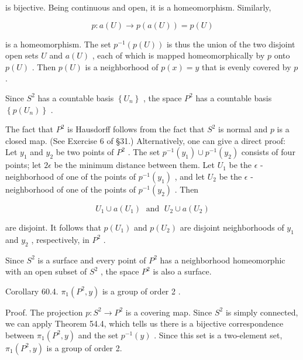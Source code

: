is bijective. Being continuous and open, it is a homeomorphism. Similarly,

\[
p : a\left( U\right)  \rightarrow  p\left( {a\left( U\right) }\right)  = p\left( U\right)
\]

is a homeomorphism. The set \({p}^{-1}\left( {p\left( U\right) }\right)\) is thus the union of the two disjoint open sets \(U\) and \(a\left( U\right)\) , each of which is mapped homeomorphically by \(p\) onto \(p\left( U\right)\) . Then \(p\left( U\right)\) is a neighborhood of \(p\left( x\right)  = y\) that is evenly covered by \(p\) .

Since \({S}^{2}\) has a countable basis \(\left\{  {U}_{n}\right\}\) , the space \({P}^{2}\) has a countable basis \(\left\{  {p\left( {U}_{n}\right) }\right\}\) .

The fact that \({P}^{2}\) is Hausdorff follows from the fact that \({S}^{2}\) is normal and \(p\) is a closed map. (See Exercise 6 of §31.) Alternatively, one can give a direct proof: Let \({y}_{1}\) and \({y}_{2}\) be two points of \({P}^{2}\) . The set \({p}^{-1}\left( {y}_{1}\right)  \cup  {p}^{-1}\left( {y}_{2}\right)\) consists of four points; let \({2\epsilon }\) be the minimum distance between them. Let \({U}_{1}\) be the \(\epsilon\) -neighborhood of one of the points of \({p}^{-1}\left( {y}_{1}\right)\) , and let \({U}_{2}\) be the \(\epsilon\) -neighborhood of one of the points of \({p}^{-1}\left( {y}_{2}\right)\) . Then

\[
{U}_{1} \cup  a\left( {U}_{1}\right) \;\text{ and }\;{U}_{2} \cup  a\left( {U}_{2}\right)
\]

are disjoint. It follows that \(p\left( {U}_{1}\right)\) and \(p\left( {U}_{2}\right)\) are disjoint neighborhoods of \({y}_{1}\) and \({y}_{2}\) , respectively, in \({P}^{2}\) .

Since \({S}^{2}\) is a surface and every point of \({P}^{2}\) has a neighborhood homeomorphic with an open subset of \({S}^{2}\) , the space \({P}^{2}\) is also a surface.

Corollary 60.4. \({\pi }_{1}\left( {{P}^{2},y}\right)\) is a group of order 2 .

Proof. The projection \(p : {S}^{2} \rightarrow  {P}^{2}\) is a covering map. Since \({S}^{2}\) is simply connected, we can apply Theorem 54.4, which tells us there is a bijective correspondence between \({\pi }_{1}\left( {{P}^{2},y}\right)\) and the set \({p}^{-1}\left( y\right)\) . Since this set is a two-element set, \({\pi }_{1}\left( {{P}^{2},y}\right)\) is a group of order 2.

